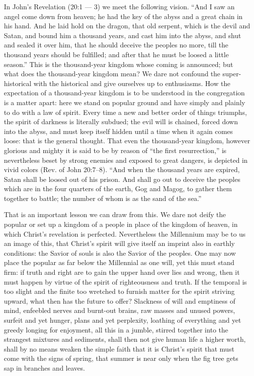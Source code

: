\documentclass[12pt,a4paper,openany]{book}
\newcommand{\opage}[1]{\marginnote{\footnotesize\textit{[#1]}}}
\begin{document}
In John's Revelation (20:1 --- 3) we meet the following
vision. ``And I saw an angel come down from heaven;
he had the key of the abyss and a great chain
in his hand. And he laid hold on the dragon, that old serpent,
which is the devil and Satan, and bound him a thousand
years, and cast him into the abyss, and shut and sealed it
over him, that he should deceive the peoples no more,
till the thousand years should be fulfilled; and after that
he must be loosed a little season.'' This is the thousand-year
kingdom whose coming is announced; but what
does the thousand-year kingdom mean? We dare not confound
the super-historical with the historical and give ourselves
up to enthusiasms. How the expectation of
a thousand-year kingdom is to be understood in the congregation is a
matter apart: here we stand on popular ground and have
simply and plainly to do with a law of spirit. Every time a
\setcounter{footnote}{0}%
\opage{43}new and better order of things triumphs, the spirit of darkness
is literally subdued; the evil will is chained, forced
down into the abyss, and must keep itself hidden until a time
when it again comes loose: that is the general thought.
That even the thousand-year kingdom, however glorious and mighty
it is said to be by reason of ``the first resurrection,''
is nevertheless beset by strong enemies and exposed
to great dangers, is depicted in vivid colors (Rev.
of John 20:7--8). ``And when the thousand years are expired,
Satan shall be loosed out of his prison. And shall go out
to deceive the peoples which are in the four quarters of the earth, Gog and
Magog, to gather them together to battle; the number of whom is as
the sand of the sea.''

That is an important lesson we can draw from this.
We dare not deify the popular or set up a kingdom of a people
in place of the kingdom of heaven, in which Christ's
revelation is perfected. Nevertheless the Millennium
may be to us an image of this, that Christ's spirit
will give itself an imprint also in earthly conditions: the Savior
of souls is also the Savior of the peoples. One may now place
the popular as far below the Millennial as
one will, yet this must stand firm: if truth
and right are to gain the upper hand over lies and wrong, then it
must happen by virtue of the spirit of righteousness and truth.
If the temporal is too slight and the finite too
wretched to furnish matter for the spirit striving upward,
what then has the future to offer? Slackness of will and
emptiness of mind, enfeebled nerves and burnt-out brains,
raw masses and unused powers, surfeit and yet
hunger, plans and yet perplexity, loathing of
everything and yet greedy longing for enjoyment, all this in a
jumble, stirred together into the strangest
\setcounter{footnote}{0}%
\opage{44}mixtures and sediments, shall then not give human life
a higher worth, shall by no means weaken the
simple faith that it is Christ's spirit that must come
with the signs of spring, that summer is near only when
the fig tree gets sap in branches and leaves.
\end{document}
